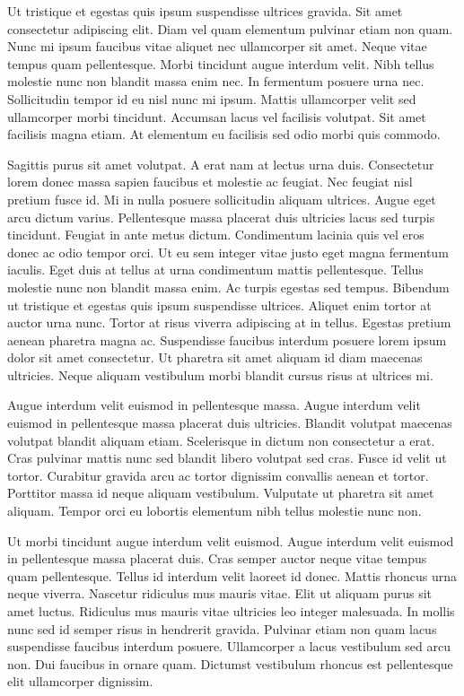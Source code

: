 \documentclass[
]{book}
\theoremstyle{definition}
\theoremstyle{definition}
\theoremstyle{definition}
\theoremstyle{definition}
\theoremstyle{remark}
\begin{document}
Ut tristique et egestas quis ipsum suspendisse ultrices gravida. Sit amet consectetur adipiscing elit. Diam vel quam elementum pulvinar etiam non quam. Nunc mi ipsum faucibus vitae aliquet nec ullamcorper sit amet. Neque vitae tempus quam pellentesque. Morbi tincidunt augue interdum velit. Nibh tellus molestie nunc non blandit massa enim nec. In fermentum posuere urna nec. Sollicitudin tempor id eu nisl nunc mi ipsum. Mattis ullamcorper velit sed ullamcorper morbi tincidunt. Accumsan lacus vel facilisis volutpat. Sit amet facilisis magna etiam. At elementum eu facilisis sed odio morbi quis commodo.

Sagittis purus sit amet volutpat. A erat nam at lectus urna duis. Consectetur lorem donec massa sapien faucibus et molestie ac feugiat. Nec feugiat nisl pretium fusce id. Mi in nulla posuere sollicitudin aliquam ultrices. Augue eget arcu dictum varius. Pellentesque massa placerat duis ultricies lacus sed turpis tincidunt. Feugiat in ante metus dictum. Condimentum lacinia quis vel eros donec ac odio tempor orci. Ut eu sem integer vitae justo eget magna fermentum iaculis. Eget duis at tellus at urna condimentum mattis pellentesque. Tellus molestie nunc non blandit massa enim. Ac turpis egestas sed tempus. Bibendum ut tristique et egestas quis ipsum suspendisse ultrices. Aliquet enim tortor at auctor urna nunc. Tortor at risus viverra adipiscing at in tellus. Egestas pretium aenean pharetra magna ac. Suspendisse faucibus interdum posuere lorem ipsum dolor sit amet consectetur. Ut pharetra sit amet aliquam id diam maecenas ultricies. Neque aliquam vestibulum morbi blandit cursus risus at ultrices mi.

Augue interdum velit euismod in pellentesque massa. Augue interdum velit euismod in pellentesque massa placerat duis ultricies. Blandit volutpat maecenas volutpat blandit aliquam etiam. Scelerisque in dictum non consectetur a erat. Cras pulvinar mattis nunc sed blandit libero volutpat sed cras. Fusce id velit ut tortor. Curabitur gravida arcu ac tortor dignissim convallis aenean et tortor. Porttitor massa id neque aliquam vestibulum. Vulputate ut pharetra sit amet aliquam. Tempor orci eu lobortis elementum nibh tellus molestie nunc non.

Ut morbi tincidunt augue interdum velit euismod. Augue interdum velit euismod in pellentesque massa placerat duis. Cras semper auctor neque vitae tempus quam pellentesque. Tellus id interdum velit laoreet id donec. Mattis rhoncus urna neque viverra. Nascetur ridiculus mus mauris vitae. Elit ut aliquam purus sit amet luctus. Ridiculus mus mauris vitae ultricies leo integer malesuada. In mollis nunc sed id semper risus in hendrerit gravida. Pulvinar etiam non quam lacus suspendisse faucibus interdum posuere. Ullamcorper a lacus vestibulum sed arcu non. Dui faucibus in ornare quam. Dictumst vestibulum rhoncus est pellentesque elit ullamcorper dignissim.
\end{document}
